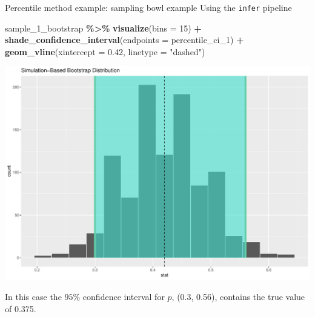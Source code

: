\documentclass[
  ignorenonframetext,
]{beamer}
\newenvironment{Shaded}{\begin{snugshade}}{\end{snugshade}}
\newcommand{\AttributeTok}[1]{\textcolor[rgb]{0.13,0.29,0.53}{#1}}
\newcommand{\DecValTok}[1]{\textcolor[rgb]{0.00,0.00,0.81}{#1}}
\newcommand{\FloatTok}[1]{\textcolor[rgb]{0.00,0.00,0.81}{#1}}
\newcommand{\FunctionTok}[1]{\textcolor[rgb]{0.13,0.29,0.53}{\textbf{#1}}}
\newcommand{\NormalTok}[1]{#1}
\newcommand{\SpecialCharTok}[1]{\textcolor[rgb]{0.81,0.36,0.00}{\textbf{#1}}}
\newcommand{\StringTok}[1]{\textcolor[rgb]{0.31,0.60,0.02}{#1}}
\begin{document}
\begin{frame}[fragile]{Percentile method example: sampling bowl example}
\protect\hypertarget{percentile-method-example-sampling-bowl-example-1}{}
Using the \texttt{infer} pipeline

\tiny

\begin{Shaded}
\begin{Highlighting}[]
\NormalTok{sample\_1\_bootstrap }\SpecialCharTok{\%\textgreater{}\%} 
  \FunctionTok{visualize}\NormalTok{(}\AttributeTok{bins =} \DecValTok{15}\NormalTok{) }\SpecialCharTok{+} 
  \FunctionTok{shade\_confidence\_interval}\NormalTok{(}\AttributeTok{endpoints =}\NormalTok{ percentile\_ci\_1) }\SpecialCharTok{+}
  \FunctionTok{geom\_vline}\NormalTok{(}\AttributeTok{xintercept =} \FloatTok{0.42}\NormalTok{, }\AttributeTok{linetype =} \StringTok{"dashed"}\NormalTok{)}
\end{Highlighting}
\end{Shaded}

\begin{center}\includegraphics[width=0.7\linewidth,height=0.45\textheight]{Week10A_files/figure-beamer/unnamed-chunk-23-1} \end{center}
\normalsize

In this case the \(95\%\) confidence interval for \(p\), (0.3, 0.56),
contains the true value of 0.375.
\end{frame}
\end{document}

